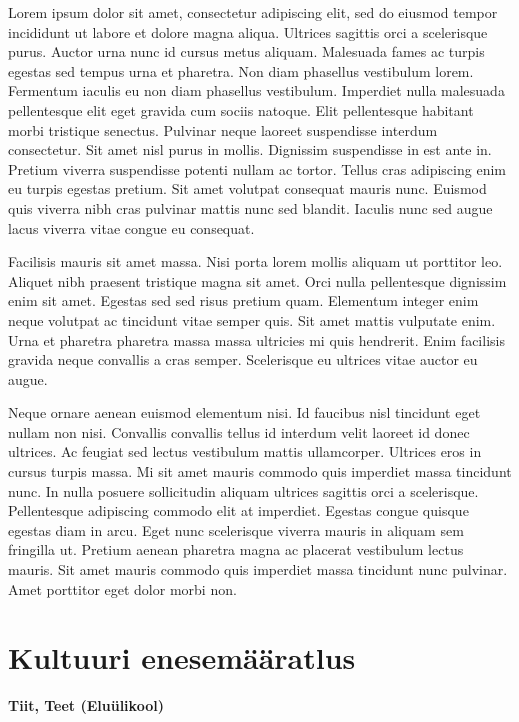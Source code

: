 \documentclass[]{book}
\begin{document}
Lorem ipsum dolor sit amet, consectetur adipiscing elit, sed do eiusmod tempor incididunt ut labore et dolore magna aliqua. Ultrices sagittis orci a scelerisque purus. Auctor urna nunc id cursus metus aliquam. Malesuada fames ac turpis egestas sed tempus urna et pharetra. Non diam phasellus vestibulum lorem. Fermentum iaculis eu non diam phasellus vestibulum. Imperdiet nulla malesuada pellentesque elit eget gravida cum sociis natoque. Elit pellentesque habitant morbi tristique senectus. Pulvinar neque laoreet suspendisse interdum consectetur. Sit amet nisl purus in mollis. Dignissim suspendisse in est ante in. Pretium viverra suspendisse potenti nullam ac tortor. Tellus cras adipiscing enim eu turpis egestas pretium. Sit amet volutpat consequat mauris nunc. Euismod quis viverra nibh cras pulvinar mattis nunc sed blandit. Iaculis nunc sed augue lacus viverra vitae congue eu consequat.

Facilisis mauris sit amet massa. Nisi porta lorem mollis aliquam ut porttitor leo. Aliquet nibh praesent tristique magna sit amet. Orci nulla pellentesque dignissim enim sit amet. Egestas sed sed risus pretium quam. Elementum integer enim neque volutpat ac tincidunt vitae semper quis. Sit amet mattis vulputate enim. Urna et pharetra pharetra massa massa ultricies mi quis hendrerit. Enim facilisis gravida neque convallis a cras semper. Scelerisque eu ultrices vitae auctor eu augue.

Neque ornare aenean euismod elementum nisi. Id faucibus nisl tincidunt eget nullam non nisi. Convallis convallis tellus id interdum velit laoreet id donec ultrices. Ac feugiat sed lectus vestibulum mattis ullamcorper. Ultrices eros in cursus turpis massa. Mi sit amet mauris commodo quis imperdiet massa tincidunt nunc. In nulla posuere sollicitudin aliquam ultrices sagittis orci a scelerisque. Pellentesque adipiscing commodo elit at imperdiet. Egestas congue quisque egestas diam in arcu. Eget nunc scelerisque viverra mauris in aliquam sem fringilla ut. Pretium aenean pharetra magna ac placerat vestibulum lectus mauris. Sit amet mauris commodo quis imperdiet massa tincidunt nunc pulvinar. Amet porttitor eget dolor morbi non.

\hypertarget{chapter11}{%
\section{Kultuuri enesemääratlus}\label{chapter11}}

\begin{authors}
\textbf{Tiit, Teet (Eluülikool)}
\end{authors}
\end{document}
